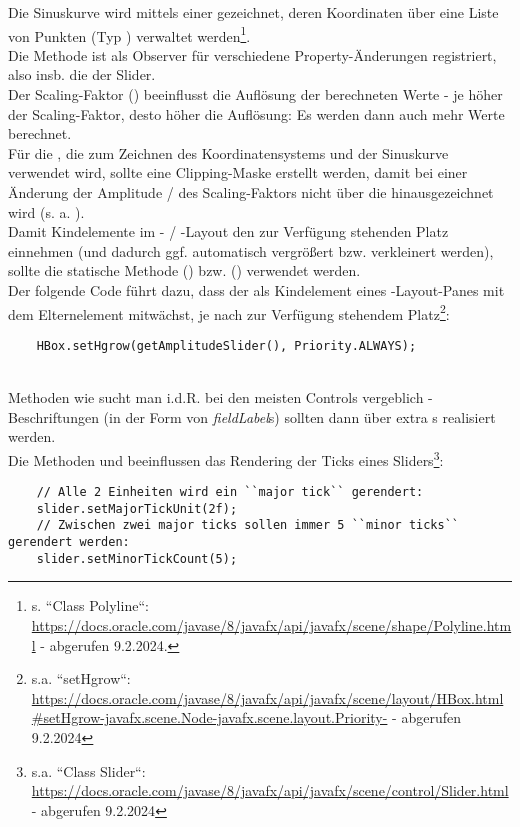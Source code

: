 Die Sinuskurve wird mittels einer  gezeichnet, deren Koordinaten über eine Liste von Punkten (Typ ) verwaltet werden\footnote{
s. ``Class Polyline``: \url{https://docs.oracle.com/javase/8/javafx/api/javafx/scene/shape/Polyline.html} - abgerufen 9.2.2024.
}.\\

\noindent
Die Methode ist als Observer für verschiedene Property-Änderungen registriert, also insb. die der Slider.\\

\noindent
Der Scaling-Faktor () beeinflusst die Auflösung der berechneten Werte - je höher der Scaling-Faktor, desto höher die Auflösung: Es werden dann auch mehr Werte berechnet.\\

\noindent
Für die , die zum Zeichnen des Koordinatensystems und der Sinuskurve verwendet wird, sollte eine Clipping-Maske erstellt werden, damit bei einer Änderung der Amplitude / des Scaling-Faktors nicht über die  hinausgezeichnet wird (s. a. \cite[222]{Oec22}).\\

\noindent
Damit Kindelemente im - / -Layout den zur Verfügung stehenden Platz einnehmen (und dadurch ggf. automatisch vergrößert bzw. verkleinert werden), sollte  die statische Methode  () bzw.  () verwendet werden.\\
Der folgende Code führt dazu, dass der  als Kindelement eines -Layout-Panes mit dem Elternelement mitwächst, je nach zur Verfügung stehendem Platz\footnote{
s.a. ``setHgrow``: \url{https://docs.oracle.com/javase/8/javafx/api/javafx/scene/layout/HBox.html#setHgrow-javafx.scene.Node-javafx.scene.layout.Priority-} - abgerufen 9.2.2024
}:

\begin{verbatim}
    HBox.setHgrow(getAmplitudeSlider(), Priority.ALWAYS);
\end{verbatim}\\

\noindent
Methoden wie  sucht man i.d.R. bei den meisten Controls vergeblich - Beschriftungen (in der Form von \textit{fieldLabel}s) sollten dann über extra s realisiert werden.\\

\noindent
Die Methoden  und  beeinflussen das Rendering der Ticks eines Sliders\footnote{
s.a. ``Class Slider``: \url{https://docs.oracle.com/javase/8/javafx/api/javafx/scene/control/Slider.html} - abgerufen 9.2.2024
}:

\noindent
\begin{verbatim}
    // Alle 2 Einheiten wird ein ``major tick`` gerendert:
    slider.setMajorTickUnit(2f);
    // Zwischen zwei major ticks sollen immer 5 ``minor ticks`` gerendert werden:
    slider.setMinorTickCount(5);
\end{verbatim}